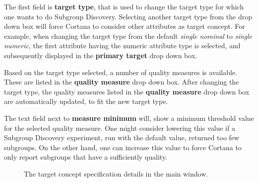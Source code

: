 \documentclass{article}
\begin{document}
The first field is {\bf target type}, that is used to change the target type for which one wants to do Subgroup Discovery.
Selecting another target type from the drop down box will force Cortana to consider other attributes as target concept.
For example, when changing the target type from the default \emph{single nominal} to \emph{single numeric}, the first attribute having the numeric attribute type is selected, and subsequently displayed in the {\bf primary target} drop down box.

Based on the target type selected, a number of quality measures is available.
These are listed in the {\bf quality measure} drop down box.
After changing the target type, the quality measures listed in the {\bf quality measure} drop down box are automatically updated, to fit the new target type.

The text field next to {\bf measure minimum} will, show a minimum threshold value for the selected quality measure.
One might consider lowering this value if a Subgroup Discovery experiment, run with the default value, returned too few subgroups.
On the other hand, one can increase this value to force Cortana to only report subgroups that have a sufficiently quality.

\begin{figure}
\begin{center}
\centering
{}
\caption{The target concept specification details in the main window.}
\end{center}
\label{fig:targetconcept}
\end{figure}

\end{document}
